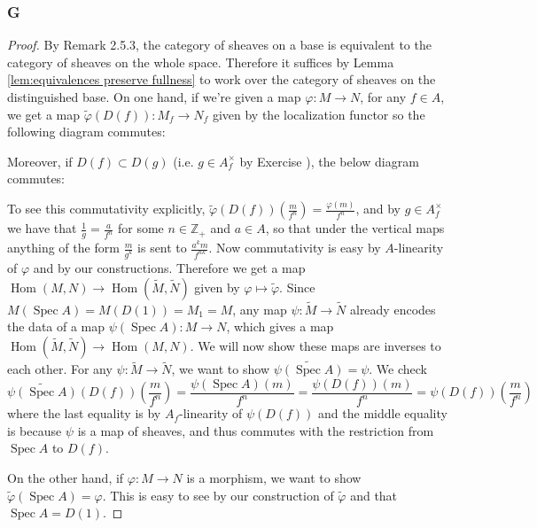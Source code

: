 \documentclass{article}
\newcommand{\Z}{\mathbb{Z}}
\DeclareMathOperator{\Hom}{\mathrm{Hom}}
\DeclareMathOperator{\Spec}{\mathrm{Spec}}
\theoremstyle{definition} %
\begin{document}
\subsubsection{G}
\begin{proof}
    By Remark 2.5.3,  the category of sheaves on a base is equivalent to the category of sheaves on the whole space. Therefore it suffices by Lemma \ref{lem:equivalences preserve fullness} to work over the category of sheaves on the distinguished base. On one hand, if we're given a map $\varphi:M\to N$, for any $f\in A$, we get a map $\widetilde \varphi (D(f)):M_f \to N_f$ given by the localization functor so the following diagram commutes:
    \begin{center}
    \end{center}
    Moreover, if $D(f)\subset D(g)$ (i.e. $g \in A_f^\times$ by Exercise %
    ), the below diagram commutes:
    \begin{center}
    \end{center}
    To see this commutativity explicitly, $\widetilde \varphi(D(f))(\frac{m}{f^n})=\frac{\varphi(m)}{f^n}$, and by $g\in A_f^\times$ we have that $\frac{1}{g}=\frac{a}{f^n}$ for some $n\in \Z_+$ and $a\in A$, so that under the vertical maps anything of the form $\frac{m}{g^k}$ is sent to $\frac{a^km}{f^{nk}}$. Now commutativity is easy by $A$-linearity of $\varphi$ and by our constructions. Therefore we get a map $\Hom(M,N)\to \Hom (\widetilde M, \widetilde N)$ given by $\varphi \mapsto \widetilde \varphi$. Since $M(\Spec A)=M(D(1))=M_1=M$, any map $\psi:\widetilde M\to \widetilde N$ already encodes the data of a map $\psi(\Spec A):M\to N$, which gives a map $\Hom(\tilde M, \tilde N) \to \Hom(M,N).$ We will now show these maps are inverses to each other. For any $\psi:\tilde M \to \tilde N$, we want to show $\widetilde{\psi(\Spec A)} = \psi$. We check
    \[
    \widetilde{\psi(\Spec A)}(D(f))(\frac{m}{f^n})=\frac{\psi(\Spec A)(m)}{f^n} = \frac{\psi(D(f))(m)}{f^n} = \psi(D(f))(\frac{m}{f^n})
    \]
    where the last equality is by $A_f$-linearity of $\psi(D(f))$ and the middle equality is because $\psi$ is a map of sheaves, and thus commutes with the restriction from $\Spec A$ to $D(f)$.

    On the other hand, if $\varphi:M\to N$ is a morphism, we want to show $\widetilde{\varphi}(\Spec A) = \varphi$. This is easy to see by our construction of $\widetilde{\varphi}$ and that $\Spec A = D(1)$.
\end{proof}
\end{document}
